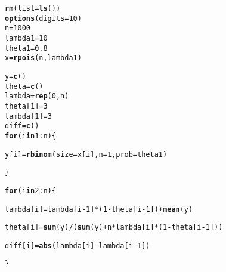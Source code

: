 \documentclass{article}\usepackage[]{graphicx}\usepackage[]{color}
\makeatletter
\newcommand{\hlnum}[1]{\textcolor[rgb]{0.686,0.059,0.569}{#1}}%
\newcommand{\hlopt}[1]{\textcolor[rgb]{0,0,0}{#1}}%
\newcommand{\hlstd}[1]{\textcolor[rgb]{0.345,0.345,0.345}{#1}}%
\newcommand{\hlkwa}[1]{\textcolor[rgb]{0.161,0.373,0.58}{\textbf{#1}}}%
\newcommand{\hlkwb}[1]{\textcolor[rgb]{0.69,0.353,0.396}{#1}}%
\newcommand{\hlkwc}[1]{\textcolor[rgb]{0.333,0.667,0.333}{#1}}%
\newcommand{\hlkwd}[1]{\textcolor[rgb]{0.737,0.353,0.396}{\textbf{#1}}}%
\newenvironment{kframe}{%
 \def\at@end@of@kframe{}%
 \ifinner\ifhmode%
  \def\at@end@of@kframe{\end{minipage}}%
  \begin{minipage}{\columnwidth}%
 \fi\fi%
 \def\FrameCommand##1{\hskip\@totalleftmargin \hskip-\fboxsep
 \colorbox{shadecolor}{##1}\hskip-\fboxsep
     \hskip-\linewidth \hskip-\@totalleftmargin \hskip\columnwidth}%
 \MakeFramed {\advance\hsize-\width
   \@totalleftmargin\z@ \linewidth\hsize
   \@setminipage}}%
 {\par\unskip\endMakeFramed%
 \at@end@of@kframe}
\newenvironment{knitrout}{}{} %
\makeatother
\begin{document}
\begin{knitrout}
\color{fgcolor}\begin{kframe}
\begin{alltt}
\hlkwd{rm}\hlstd{(}\hlkwc{list}\hlstd{=}\hlkwd{ls}\hlstd{())}
\hlkwd{options}\hlstd{(}\hlkwc{digits} \hlstd{=} \hlnum{10}\hlstd{)}
\hlstd{n}\hlkwb{=}\hlnum{1000}
\hlstd{lambda1}\hlkwb{=}\hlnum{10}
\hlstd{theta1}\hlkwb{=}\hlnum{0.8}
\hlstd{x}\hlkwb{=}\hlkwd{rpois}\hlstd{(n,lambda1)}




\hlstd{y}\hlkwb{=}\hlkwd{c}\hlstd{()}
\hlstd{theta}\hlkwb{=}\hlkwd{c}\hlstd{()}
\hlstd{lambda}\hlkwb{=}\hlkwd{rep}\hlstd{(}\hlnum{0}\hlstd{,n)}
\hlstd{theta[}\hlnum{1}\hlstd{]}\hlkwb{=}\hlnum{3}
\hlstd{lambda[}\hlnum{1}\hlstd{]}\hlkwb{=}\hlnum{3}
\hlstd{diff}\hlkwb{=}\hlkwd{c}\hlstd{()}
\hlkwa{for} \hlstd{(i} \hlkwa{in} \hlnum{1}\hlopt{:}\hlstd{n)\{}


  \hlstd{y[i]}\hlkwb{=}\hlkwd{rbinom}\hlstd{(}\hlkwc{size}\hlstd{=x[i],} \hlkwc{n}\hlstd{=}\hlnum{1}\hlstd{,} \hlkwc{prob}\hlstd{=theta1)}




\hlstd{\}}





\hlkwa{for} \hlstd{(i} \hlkwa{in} \hlnum{2}\hlopt{:}\hlstd{n)\{}

\hlstd{lambda[i]} \hlkwb{=}\hlstd{lambda[i}\hlopt{-}\hlnum{1}\hlstd{]}\hlopt{*}\hlstd{(}\hlnum{1}\hlopt{-}\hlstd{theta[i}\hlopt{-}\hlnum{1}\hlstd{])}\hlopt{+}\hlkwd{mean}\hlstd{(y)}

\hlstd{theta[i]}\hlkwb{=}\hlkwd{sum}\hlstd{(y)}\hlopt{/}\hlstd{(}\hlkwd{sum}\hlstd{(y)}\hlopt{+}\hlstd{n}\hlopt{*}\hlstd{lambda[i]}\hlopt{*}\hlstd{(}\hlnum{1}\hlopt{-}\hlstd{theta[i}\hlopt{-}\hlnum{1}\hlstd{]))}

\hlstd{diff[i]}\hlkwb{=}\hlkwd{abs}\hlstd{(lambda[i]}\hlopt{-}\hlstd{lambda[i}\hlopt{-}\hlnum{1}\hlstd{])}

\hlstd{\}}


\end{alltt}
\end{kframe}
\end{knitrout}
\end{document}

